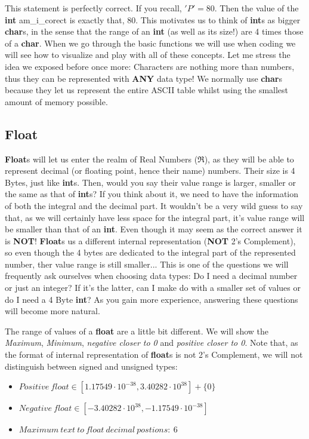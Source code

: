 \documentclass[12pt]{book}
\begin{document}
This statement is perfectly correct. If you recall, $'P' = 80$. Then the value of the \textbf{int} am\_i\_corect is exactly that, 80. This motivates us to think of \textbf{int}s as bigger \textbf{char}s, in the sense that the range of an \textbf{int} (as well as its size!) are 4 times those of a \textbf{char}. When we go through the basic functions we will use when coding we will see how to visualize and play with all of these concepts. Let me stress the idea we exposed before once more: Characters are nothing more than numbers, thus they can be represented with \textbf{ANY} data type! We normally use \textbf{char}s because they let us represent the entire ASCII table whilst using the smallest amount of memory possible.


\subsection{Float}

\textbf{Float}s will let us enter the realm of Real Numbers ($\Re$), as they will be able to represent decimal (or floating point, hence their name) numbers. Their size is 4 Bytes, just like \textbf{int}s. Then, would you say their value range is larger, smaller or the same as that of \textbf{int}s? If you think about it, we need to have the information of both the integral and the decimal part. It wouldn't be a very wild guess to say that, as we will certainly have less space for the integral part, it's value range will be smaller than that of an \textbf{int}. Even though it may seem as the correct answer it is \textbf{NOT}! \textbf{Float}s us a different internal representation (\textbf{NOT} 2's Complement), so even though the 4 bytes are dedicated to the integral part of the represented number, ther value range is still smaller... This is one of the questions we will frequently ask ourselves when choosing data types: Do I need a decimal number or just an integer? If it's the latter, can I make do with a smaller set of values or do I need a 4 Byte \textbf{int}? As you gain more experience, answering these questions will become more natural.

The range of values of a \textbf{float} are a little bit different. We will show the \textit{Maximum}, \textit{Minimum}, \textit{negative closer to 0} and \textit{positive closer to 0}. Note that, as the format of internal representation of \textbf{float}s is not 2's Complement, we will not distinguish between signed and unsigned types:

\begin{itemize}
  \item $Positive\ float \in [1.17549 \cdot 10^{-38}, 3.40282 \cdot 10^{38}] + \{0\}$
  \item $Negative\ float \in [-3.40282 \cdot 10^{38}, -1.17549 \cdot 10^{-38}]$
  \item $Maximum\ text\ to\ float\ decimal\ postions:\ 6$
\end{itemize}
\end{document}
